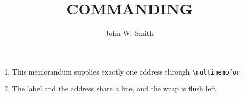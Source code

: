 \documentclass{../armymemo}
\author{John W. Smith}\rank{CPT}\branch{CY}
\title{COMMANDING}
\begin{document}
\begin{enumerate}
	\item This memorandum supplies exactly one address through \verb|\multimemofor|.
	\item The label and the address share a line, and the wrap is flush left.
\end{enumerate}
\end{document}

